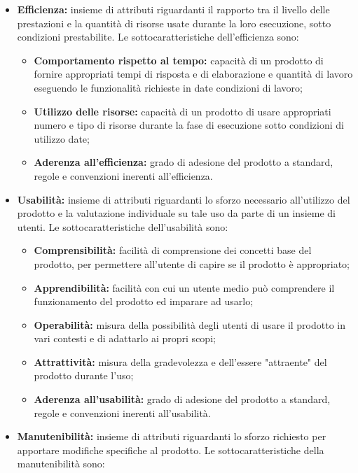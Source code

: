 \begin{itemize}
    \item \textbf{Efficienza:} insieme di attributi riguardanti il rapporto tra il livello delle prestazioni e la quantità di risorse usate durante la loro esecuzione, sotto condizioni prestabilite.
    Le sottocaratteristiche dell’efficienza sono:
    \begin{itemize}
        \item \textbf{Comportamento rispetto al tempo:} capacità di un prodotto di fornire appropriati tempi di risposta e di elaborazione e quantità di lavoro eseguendo le funzionalità richieste in date condizioni di lavoro;
        \item \textbf{Utilizzo delle risorse:} capacità di un prodotto di usare appropriati numero e tipo di risorse durante la fase di esecuzione sotto condizioni di utilizzo date;
        \item \textbf{Aderenza all'efficienza:} grado di adesione del prodotto a standard, regole e convenzioni inerenti all’efficienza.
    \end{itemize}
    \item \textbf{Usabilità:} insieme di attributi riguardanti lo sforzo necessario all’utilizzo del prodotto e la valutazione individuale su tale uso da parte di un insieme di utenti.
    Le sottocaratteristiche dell’usabilità sono:
    \begin{itemize}
        \item \textbf{Comprensibilità:} facilità di comprensione dei concetti base del prodotto, per permettere all’utente di capire se il prodotto è appropriato;
        \item \textbf{Apprendibilità:} facilità con cui un utente medio può comprendere il funzionamento del prodotto ed imparare ad usarlo;
        \item \textbf{Operabilità:} misura della possibilità degli utenti di usare il prodotto in vari contesti e di adattarlo ai propri scopi;
        \item \textbf{Attrattività:} misura della gradevolezza e dell’essere "attraente" del prodotto durante l’uso;
        \item \textbf{Aderenza all'usabilità:} grado di adesione del prodotto a standard, regole e convenzioni inerenti all’usabilità.
    \end{itemize}
    \item \textbf{Manutenibilità:} insieme di attributi riguardanti lo sforzo richiesto per apportare modifiche specifiche al prodotto.
    Le sottocaratteristiche della manutenibilità sono:
    \begin{itemize}

\end{itemize}
\end{itemize}
